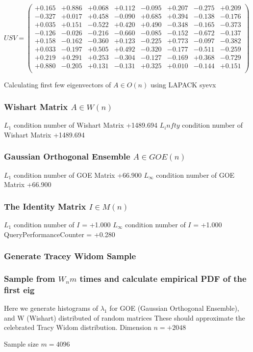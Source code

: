 \documentclass[9pt]{article}
\theoremstyle{plain}
\theoremstyle{definition}
\theoremstyle{remark}
\numberwithin{equation}{section}
\begin{document}
$U S V = \left(
\begin{array}{
cccccccc}
+0.165 & +0.886 & +0.068 & +0.112 & -0.095 & +0.207 & -0.275 & +0.209 \\
-0.327 & +0.017 & +0.458 & -0.090 & +0.685 & +0.394 & -0.138 & -0.176 \\
+0.035 & +0.151 & -0.522 & +0.420 & +0.490 & -0.348 & -0.165 & -0.373 \\
-0.126 & -0.026 & -0.216 & -0.660 & -0.085 & -0.152 & -0.672 & -0.137 \\
+0.158 & -0.162 & -0.360 & +0.123 & -0.225 & +0.773 & -0.097 & -0.382 \\
+0.033 & -0.197 & +0.505 & +0.492 & -0.320 & -0.177 & -0.511 & -0.259 \\
+0.219 & +0.291 & +0.253 & -0.304 & -0.127 & -0.169 & +0.368 & -0.729 \\
+0.880 & -0.205 & +0.131 & -0.131 & +0.325 & +0.010 & -0.144 & +0.151 \\
\end{array}
\right)$ \newline 

Calculating first few eigenvectors of $A \in O(n)$ using LAPACK syevx

\subsubsection{Wishart Matrix $A \in W(n)$}
$L_1$ condition number of Wishart Matrix +1489.694
$L_infty$ condition number of Wishart Matrix +1489.694
\subsubsection{Gaussian Orthogonal Ensemble $A \in GOE(n)$}
$L_1$ condition number of GOE Matrix +66.900
$L_\infty$ condition number of GOE Matrix +66.900
\subsubsection{The Identity Matrix $I \in M(n)$}
$L_1$ condition number of $I$ = +1.000
$L_\infty$ condition number of $I$ = +1.000
QueryPerformanceCounter  =  +0.280
\subsubsection{Generate Tracey Widom Sample}
\subsubsection{Sample from $W_n m$ times and calculate empirical PDF of the first eig}
Here we generate histograms of $\lambda_1$ for GOE (Gaussian Orthogonal Ensemble), and W (Wishart) 		 distributed of random matrices
These should approximate the celebrated Tracy Widom distribution.
Dimension $n = +2048$

Sample size $m = 4096$
\end{document}
